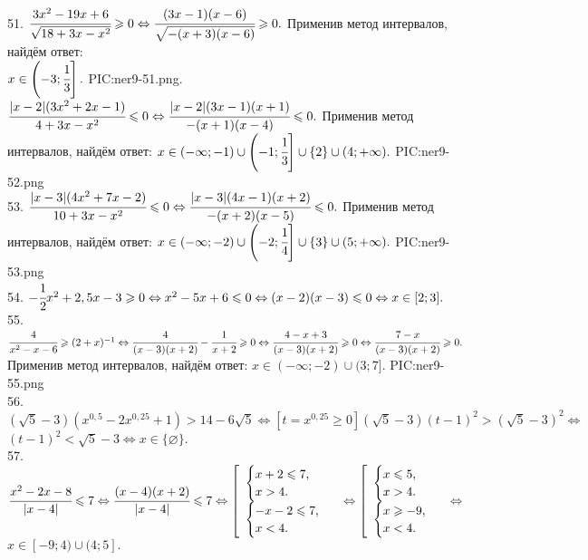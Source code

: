 51. $\cfrac{3x^2-19x+6}{\sqrt{18+3x-x^2}}\geqslant0\Leftrightarrow\cfrac{(3x-1)(x-6)}{\sqrt{-(x+3)(x-6)}}\geqslant0.$ Применив метод интервалов, найдём ответ:\\ $x\in\left(-3;\cfrac{1}{3}\right].$
{{PIC:ner9-51.png}}\newpage{}. $\cfrac{|x-2|(3x^2+2x-1)}{4+3x-x^2}\leqslant0\Leftrightarrow\cfrac{|x-2|(3x-1)(x+1)}{-(x+1)(x-4)}\leqslant0.$ Применив метод интервалов, найдём ответ: $x\in(-\infty;-1)\cup\left(-1;\cfrac{1}{3}\right]\cup\{2\}\cup(4;+\infty).$
{{PIC:ner9-52.png}}\\
53. $\cfrac{|x-3|(4x^2+7x-2)}{10+3x-x^2}\leqslant0\Leftrightarrow\cfrac{|x-3|(4x-1)(x+2)}{-(x+2)(x-5)}\leqslant0.$ Применив метод интервалов, найдём ответ: $x\in(-\infty;-2)\cup\left(-2;\cfrac{1}{4}\right]\cup\{3\}\cup(5;+\infty).$
{{PIC:ner9-53.png}}\\
54. $-\cfrac{1}{2}x^2+2,5x-3\geqslant0\Leftrightarrow x^2-5x+6\leqslant0\Leftrightarrow (x-2)(x-3)\leqslant0\Leftrightarrow x\in[2;3].$\\
55. $\cfrac{4}{x^2-x-6}\geqslant(2+x)^{-1}\Leftrightarrow\cfrac{4}{(x-3)(x+2)}-\cfrac{1}{x+2}\geqslant0\Leftrightarrow\cfrac{4-x+3}{(x-3)(x+2)}\geqslant0
\Leftrightarrow\cfrac{7-x}{(x-3)(x+2)}\geqslant0.$ Применив метод интервалов, найдём ответ: $x\in(-\infty;-2)\cup(3;7].$
{{PIC:ner9-55.png}}\\
56. $(\sqrt{5}-3)(x^{0,5}-2x^{0,25}+1)>14-6\sqrt{5}\Leftrightarrow[t=x^{0,25}\geqslant0](\sqrt{5}-3)(t-1)^2>(\sqrt{5}-3)^2\Leftrightarrow$\\$ (t-1)^2<\sqrt{5}-3
\Leftrightarrow x\in\{\varnothing\}.$\\
57. $\cfrac{x^2-2x-8}{|x-4|}\leqslant 7\Leftrightarrow\cfrac{(x-4)(x+2)}{|x-4|}\leqslant 7\Leftrightarrow\left[\begin{array}{l} \begin{cases} x+2\leqslant7,\\ x>4.\end{cases}\\ \begin{cases} -x-2\leqslant7,\\ x<4.\end{cases}\end{array}\right.\Leftrightarrow\left[\begin{array}{l} \begin{cases} x\leqslant5,\\ x>4.\end{cases}\\ \begin{cases} x\geqslant-9,\\ x<4.\end{cases}\end{array}\right.\Leftrightarrow$\\$ x \in[-9;4)\cup(4;5].$\\

